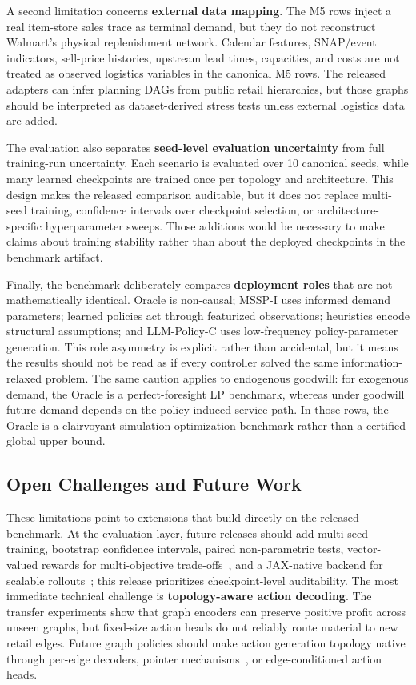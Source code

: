\documentclass[10pt,a4paper]{article}
\begin{document}
A second limitation concerns \textbf{external data mapping}. The M5 rows
inject a real item-store sales trace as terminal demand, but they do not
reconstruct Walmart's physical replenishment network. Calendar features,
SNAP/event indicators, sell-price histories, upstream lead times,
capacities, and costs are not treated as observed logistics variables in
the canonical M5 rows. The released adapters can infer planning DAGs from
public retail hierarchies, but those graphs should be interpreted as
dataset-derived stress tests unless external logistics data are added.

The evaluation also separates \textbf{seed-level evaluation uncertainty}
from full training-run uncertainty. Each scenario is evaluated over 10
canonical seeds, while many learned checkpoints are trained once per
topology and architecture. This design makes the released comparison
auditable, but it does not replace multi-seed training, confidence
intervals over checkpoint selection, or architecture-specific
hyperparameter sweeps. Those additions would be necessary to make claims
about training stability rather than about the deployed checkpoints in
the benchmark artifact.

Finally, the benchmark deliberately compares \textbf{deployment roles}
that are not mathematically identical. Oracle is non-causal; MSSP-I uses
informed demand parameters; learned policies act through featurized
observations; heuristics encode structural assumptions; and LLM-Policy-C
uses low-frequency policy-parameter generation. This role asymmetry is
explicit rather than accidental, but it means the results should not be
read as if every controller solved the same information-relaxed problem.
The same caution applies to endogenous goodwill: for exogenous demand,
the Oracle is a perfect-foresight LP benchmark, whereas under goodwill
future demand depends on the policy-induced service path. In those rows,
the Oracle is a clairvoyant simulation-optimization benchmark rather than
a certified global upper bound.

\subsection{Open Challenges and Future Work}

These limitations point to extensions that build directly on the
released benchmark. At the evaluation layer, future releases should add
multi-seed training, bootstrap confidence intervals, paired
non-parametric tests, vector-valued rewards for multi-objective
trade-offs~\citep{felten2023toolkit}, and a JAX-native backend for
scalable rollouts~\citep{bonnet2024jumanji}; this release prioritizes
checkpoint-level auditability. The most immediate technical challenge is
\textbf{topology-aware action decoding}. The transfer experiments show that
graph encoders can preserve positive profit across unseen graphs, but
fixed-size action heads do not reliably route material to new retail
edges. Future graph policies should make action generation topology
native through per-edge decoders, pointer mechanisms~\citep{vinyals2015},
or edge-conditioned action heads.
\end{document}
